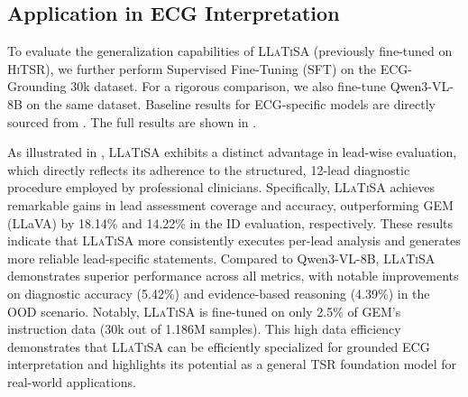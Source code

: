\documentclass[11pt]{article}
\begin{document}
\subsection{Application in ECG Interpretation}
To evaluate the generalization capabilities of \textsc{LLaTiSA} (previously fine-tuned on \textsc{HiTSR}), we further perform Supervised Fine-Tuning (SFT) on the ECG-Grounding 30k dataset. For a rigorous comparison, we also fine-tune Qwen3-VL-8B on the same dataset. Baseline results for ECG-specific models are directly sourced from \cite{ecgrounding}. The full results are shown in .

As illustrated in , \textsc{LLaTiSA} exhibits a distinct advantage in lead-wise evaluation, which directly reflects its adherence to the structured, 12-lead diagnostic procedure employed by professional clinicians. Specifically, \textsc{LLaTiSA} achieves remarkable gains in lead assessment coverage and accuracy, outperforming GEM (LLaVA) by 18.14\% and 14.22\% in the ID evaluation, respectively. These results indicate that \textsc{LLaTiSA} more consistently executes per-lead analysis and generates more reliable lead-specific statements. 
Compared to Qwen3-VL-8B, \textsc{LLaTiSA} demonstrates superior performance across all metrics, with notable improvements on diagnostic accuracy (5.42\%) and evidence-based reasoning (4.39\%) in the OOD scenario. 
Notably, \textsc{LLaTiSA} is fine-tuned on only 2.5\% of GEM’s instruction data (30k out of 1.186M samples). This high data efficiency demonstrates that \textsc{LLaTiSA} can be efficiently specialized for grounded ECG interpretation and highlights its potential as a general TSR foundation model for real-world applications.
\end{document}
